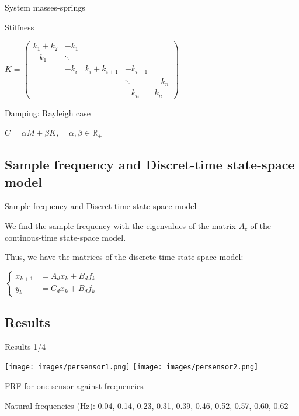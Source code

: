 \documentclass{beamer}
\begin{document}
\begin{frame}{System masses-springs}

\begin{exampleblock}{Stiffness}
\begin{center}
$
K = 
\begin{pmatrix} 
k_1 + k_2 & - k_1 \\ 
- k_1 &\ddots\\ 
& -k_i & k_i + k_{i+1} & -k_{i+1} \\
&&&\ddots& -k_n\\
&&& -k_n & k_n
\end{pmatrix}
$
\end{center}
\end{exampleblock}

\begin{exampleblock}{Damping: Rayleigh case}
\begin{center}
$C = \alpha M + \beta K,\ \ \ \ \ \alpha, \beta \in \mathbb{R}_+$
\end{center}
\end{exampleblock}

\end{frame}

\subsection{Sample frequency and Discret-time state-space model}
\begin{frame}{Sample frequency and Discret-time state-space model}

We find the sample frequency with the eigenvalues of the matrix $A_c$ of the continous-time state-space model.

\vspace{5mm}

Thus, we have the matrices of the discrete-time state-space model:
\begin{center}
$\left\{
\begin{array}{ll}
x_{k+1} & = A_dx_k + B_df_k \\
y_k & = C_dx_k + B_df_k
\end{array}
\right.$
\end{center}

\end{frame}

\subsection{Results}
\begin{frame}{Results 1/4}
\begin{center}
\texttt{[image: images/persensor1.png]}
\hfill
\texttt{[image: images/persensor2.png]}

FRF for one sensor against frequencies
\end{center}

Natural frequencies (Hz):
0.04,
0.14,
0.23,
0.31,
0.39,
0.46,
0.52,
0.57,
0.60,
0.62









\end{frame}
\end{document}

